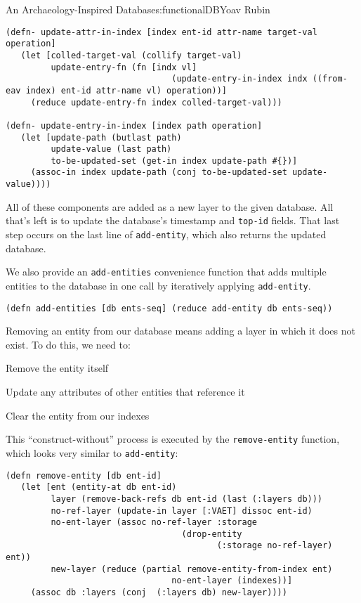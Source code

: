\begin{aosachapter}{An Archaeology-Inspired Database}{s:functionalDB}{Yoav Rubin}
\begin{verbatim}
(defn- update-attr-in-index [index ent-id attr-name target-val operation]
   (let [colled-target-val (collify target-val)
         update-entry-fn (fn [indx vl] 
                                 (update-entry-in-index indx ((from-eav index) ent-id attr-name vl) operation))]
     (reduce update-entry-fn index colled-target-val)))
     
(defn- update-entry-in-index [index path operation]
   (let [update-path (butlast path)
         update-value (last path)
         to-be-updated-set (get-in index update-path #{})]
     (assoc-in index update-path (conj to-be-updated-set update-value))))
\end{verbatim}

All of these components are added as a new layer to the given database.
All that's left is to update the database's timestamp and
\texttt{top-id} fields. That last step occurs on the last line of
\texttt{add-entity}, which also returns the updated database.

We also provide an \texttt{add-entities} convenience function that adds
multiple entities to the database in one call by iteratively applying
\texttt{add-entity}.

\begin{verbatim}
(defn add-entities [db ents-seq] (reduce add-entity db ents-seq))
\end{verbatim}

\label{removing-an-entity}

Removing an entity from our database means adding a layer in which it
does not exist. To do this, we need to:

\begin{aosaitemize}

\item
  Remove the entity itself
\item
  Update any attributes of other entities that reference it
\item
  Clear the entity from our indexes
\end{aosaitemize}

This ``construct-without'' process is executed by the
\texttt{remove-entity} function, which looks very similar to
\texttt{add-entity}:

\begin{verbatim}
(defn remove-entity [db ent-id]
   (let [ent (entity-at db ent-id)
         layer (remove-back-refs db ent-id (last (:layers db)))
         no-ref-layer (update-in layer [:VAET] dissoc ent-id)
         no-ent-layer (assoc no-ref-layer :storage 
                                   (drop-entity  
                                          (:storage no-ref-layer) ent))
         new-layer (reduce (partial remove-entity-from-index ent) 
                                 no-ent-layer (indexes))]
     (assoc db :layers (conj  (:layers db) new-layer))))
\end{verbatim}


\end{aosachapter}
